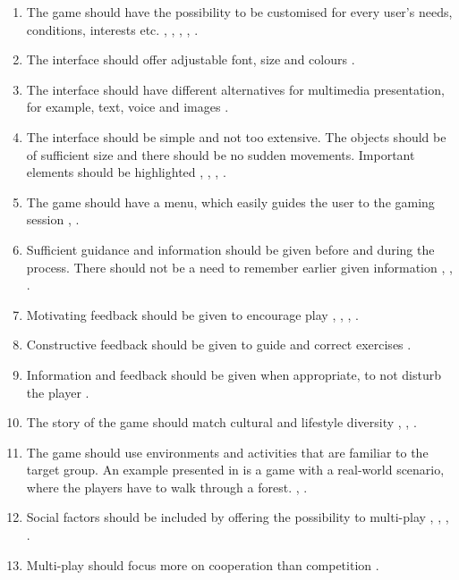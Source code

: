 \begin{enumerate}[{g}.1]
\renewcommand{\labelitemi}{$\bullet$}
\item The game should have the possibility to be customised for every user's needs, conditions, interests etc. \cite{Billis}, \cite{bruin}, \cite{gregor}, \cite{gerling1}, \cite{john2012smartsenior}.
\item The interface should offer adjustable font, size and colours \cite{Billis}.
\item The interface should have different alternatives for multimedia presentation, for example, text, voice and images \cite{Billis}.
\item The interface should be simple and not too extensive. The objects should be of sufficient size and there should be no sudden movements. Important elements should be highlighted \cite{exergamesforelderly}, \cite{Billis}, \cite{gerling1}, \cite{gerling2}.
\item The game should have a menu, which easily guides the user to the gaming session \cite{gerling2}, \cite{john2012smartsenior}.
\item Sufficient guidance and information should be given before and during the process. There should not be a need to remember earlier given information \cite{Billis}, \cite{gregor}, \cite{john2012smartsenior}.
\item Motivating feedback should be given to encourage play \cite{Billis}, \cite{gerling1}, \cite{exergamesforelderly}, \cite{john2012smartsenior}.
\item Constructive feedback should be given to guide and correct exercises \cite{john2012smartsenior}. 
\item Information and feedback should be given when appropriate, to not disturb the player \cite{exergamesforelderly}.
\item The story of the game should match cultural and lifestyle diversity \cite{Billis}, \cite{gregor}, \cite{gerling2}. 
\item The game should use environments and activities that are familiar to the target group. An example presented in \cite{gerling2} is a game with a real-world scenario, where the players have to walk through a forest. \cite{john2012smartsenior}, \cite{gerling2}.
\item Social factors should be included by offering the possibility to multi-play \cite{Billis}, \cite{gerling2}, \cite{gerling1}, \cite{exergamesforelderly}.
\item Multi-play should focus more on cooperation than competition \cite{Gajadhar}.

\end{enumerate}
